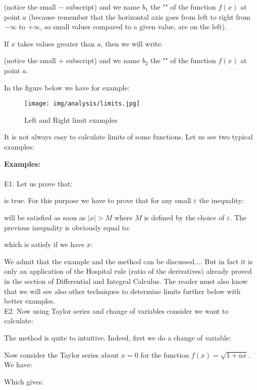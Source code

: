 	(notice the small $-$ subscript) and we name $b_1$ the "" of the function $f (x)$ at point $a$ (because remember that the horizontal axis goes from left to right from $-\infty$ to $+\infty$, so small values compared to a given value, are on the left).
	
	If $x$ takes values greater than $a$, then we will write:
	
	(notice the small $+$ subscript) and we name $b_2$ the "" of the function $f (x)$ at point $a$.
	
	In the figure below we have for example:
	
	\begin{figure}[H]
		\centering
		\texttt{[image: img/analysis/limits.jpg]}
		\caption{Left and Right limit examples}
	\end{figure}
	It is not always easy to calculate limits of some functions. Let us see two typical examples:
	\begin{tcolorbox}[colframe=black,colback=white,sharp corners]
	\textbf{{\Large {}}Examples:}\\\\
	E1. Let us prove that:
		
	is true. For this purpose we have to prove that for any small $\varepsilon$ the inequality:
	
	will be satisfied as soon as $|x|>M$ where $M$ is defined by the choice of $\varepsilon$. The previous inequality is obviously equal to:
	
	which is satisfy if we have $x$:
	
	We admit that the example and the method can be discussed.... But in fact it is only an application of the Hospital rule (ratio of the derivatives) already proved in the section of Differential and Integral Calculus. The reader must also know that we will see also other techniques to determine limits further below with better examples.\\
	
	E2. Now using Taylor series and change of variables consider we want to calculate:
	
	The method is quite to intuitive. Indeed, first we do a change of variable:
	
	Now consider the Taylor series about $x=0$ for the function $f(x)=\sqrt{1+ax}$. We have:
	
	Which gives:
	\end{tcolorbox}
	
